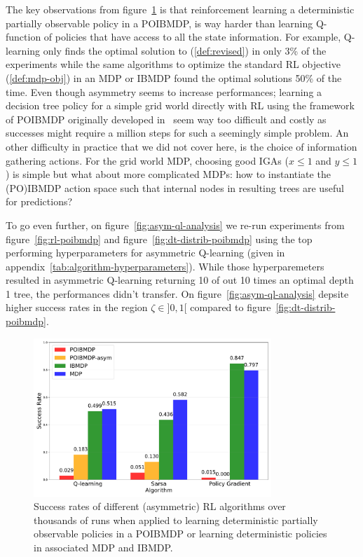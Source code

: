 The key observations from figure~\ref{fig:po-vs-ib} is that reinforcement learning a deterministic partially observable policy in a POIBMDP, is way harder than learning Q-function of policies that have access to all the state information.
For example, Q-learning only finds the optimal solution to (\ref{def:revised}) in only 3\% of the experiments while the same algorithms to optimize the standard RL objective (\ref{def:mdp-obj}) in an MDP or IBMDP found the optimal solutions 50\% of the time.
Even though asymmetry seems to increase performances; learning a decision tree policy for a simple grid world directly with RL using the framework of POIBMDP originally developed in~\cite{topin2021iterative} seem way too difficult and costly as successes might require a million steps for such a seemingly simple problem.
An other difficulty in practice that we did not cover here, is the choice of information gathering actions.
For the grid world MDP, choosing good IGAs ($x\leq1$ and $y\leq1$) is simple but what about more complicated MDPs: how to instantiate the (PO)IBMDP action space such that internal nodes in resulting trees are useful for predictions?

To go even further, on figure~\ref{fig:asym-ql-analysis} we re-run experiments from figure~\ref{fig:rl-poibmdp} and figure~\ref{fig:dt-distrib-poibmdp} using the top performing hyperparameters for asymmetric Q-learning (given in appendix~\ref{tab:algorithm-hyperparameters}).
While those hyperparemeters resulted in asymmetric Q-learning returning 10 of out 10 times an optimal depth 1 tree,
the performances didn't transfer.
On figure~\ref{fig:asym-ql-analysis} depsite higher success rates in the region $\zeta\in]0,1[$ compared to figure~\ref{fig:dt-distrib-poibmdp}. 

\begin{figure}
    \centering
    \includegraphics[width=0.8\textwidth]{images/images_part1/algorithm_performance_comparison_flattened.pdf}
    \caption{Success rates of different (asymmetric) RL algorithms over thousands of runs when applied to learning deterministic partially observable policies in a POIBMDP or learning deterministic policies in associated MDP and IBMDP.}\label{fig:po-vs-ib}
\end{figure}


